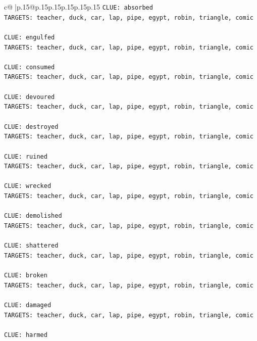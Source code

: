 \documentclass{article}
\begin{document}
{\begin{supertabular}{c@{$\;$}|p{.15\linewidth}@{}p{.15\linewidth}p{.15\linewidth}p{.15\linewidth}p{.15\linewidth}p{.15\linewidth}}
{{{\texttt{CLUE: absorbed} \\
\texttt{TARGETS: teacher, duck, car, lap, pipe, egypt, robin, triangle, comic} \\
\\ 
\texttt{CLUE: engulfed} \\
\texttt{TARGETS: teacher, duck, car, lap, pipe, egypt, robin, triangle, comic} \\
\\ 
\texttt{CLUE: consumed} \\
\texttt{TARGETS: teacher, duck, car, lap, pipe, egypt, robin, triangle, comic} \\
\\ 
\texttt{CLUE: devoured} \\
\texttt{TARGETS: teacher, duck, car, lap, pipe, egypt, robin, triangle, comic} \\
\\ 
\texttt{CLUE: destroyed} \\
\texttt{TARGETS: teacher, duck, car, lap, pipe, egypt, robin, triangle, comic} \\
\\ 
\texttt{CLUE: ruined} \\
\texttt{TARGETS: teacher, duck, car, lap, pipe, egypt, robin, triangle, comic} \\
\\ 
\texttt{CLUE: wrecked} \\
\texttt{TARGETS: teacher, duck, car, lap, pipe, egypt, robin, triangle, comic} \\
\\ 
\texttt{CLUE: demolished} \\
\texttt{TARGETS: teacher, duck, car, lap, pipe, egypt, robin, triangle, comic} \\
\\ 
\texttt{CLUE: shattered} \\
\texttt{TARGETS: teacher, duck, car, lap, pipe, egypt, robin, triangle, comic} \\
\\ 
\texttt{CLUE: broken} \\
\texttt{TARGETS: teacher, duck, car, lap, pipe, egypt, robin, triangle, comic} \\
\\ 
\texttt{CLUE: damaged} \\
\texttt{TARGETS: teacher, duck, car, lap, pipe, egypt, robin, triangle, comic} \\
\\ 
\texttt{CLUE: harmed} \\
}}}
\end{supertabular}}
\end{document}
